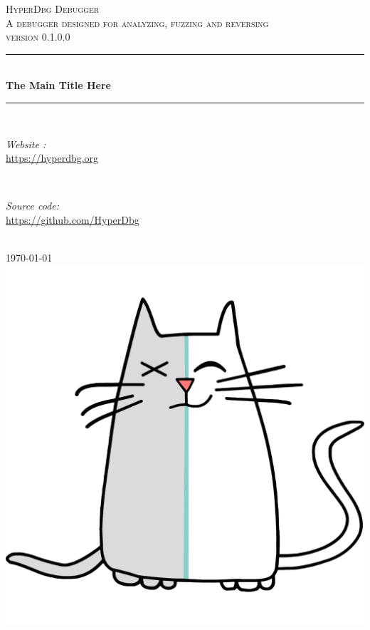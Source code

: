 \documentclass[12pt]{reporthyperdbg}
\begin{document}
\begin{titlepage}

\newcommand{\HLine}{\rule{\linewidth}{0.5mm}} %

\center %
 

\textsc{\LARGE HyperDbg Debugger}\\[1.5cm] 
\textsc{\Large A debugger designed for analyzing, fuzzing and reversing
}\\[0.5cm] 
\textsc{\large version 0.1.0.0}\\[0.5cm] 


\HLine \\[0.4cm]
{ \huge \bfseries The Main Title Here}\\[0.4cm] %
\HLine \\[1.5cm]
 

\begin{minipage}{0.4\textwidth}
\begin{flushleft} \large
\emph{Website :}\\
\url{https://hyperdbg.org} 
\end{flushleft}
\end{minipage}
~
\begin{minipage}{0.4\textwidth}
\begin{flushright} \large
\emph{Source code:} \\
\url{https://github.com/HyperDbg}
\end{flushright}
\end{minipage}\\[2cm]



{\large \today}\\[2cm] 

\includegraphics[scale=0.1]{hyperdbgcat.png}\\[1cm]

\vfill 

\end{titlepage}
\end{document}
